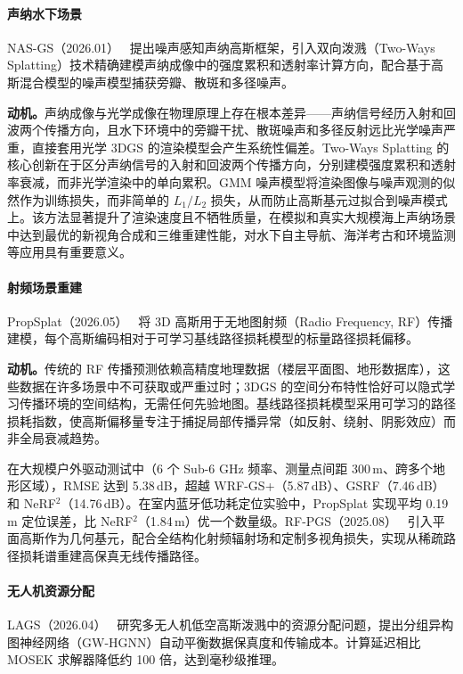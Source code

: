 \paragraph{声纳水下场景}

NAS-GS（2026.01）~\cite{2601_06285} 提出噪声感知声纳高斯框架，引入双向泼溅（Two-Ways Splatting）技术精确建模声纳成像中的强度累积和透射率计算方向，配合基于高斯混合模型的噪声模型捕获旁瓣、散斑和多径噪声。

\textbf{动机。}声纳成像与光学成像在物理原理上存在根本差异——声纳信号经历入射和回波两个传播方向，且水下环境中的旁瓣干扰、散斑噪声和多径反射远比光学噪声严重，直接套用光学 3DGS 的渲染模型会产生系统性偏差。Two-Ways Splatting 的核心创新在于区分声纳信号的入射和回波两个传播方向，分别建模强度累积和透射率衰减，而非光学渲染中的单向累积。GMM 噪声模型将渲染图像与噪声观测的似然作为训练损失，而非简单的 $L_1/L_2$ 损失，从而防止高斯基元过拟合到噪声模式上。该方法显著提升了渲染速度且不牺牲质量，在模拟和真实大规模海上声纳场景中达到最优的新视角合成和三维重建性能，对水下自主导航、海洋考古和环境监测等应用具有重要意义。

\paragraph{射频场景重建}

PropSplat（2026.05）~\cite{2605_08035} 将 3D 高斯用于无地图射频（Radio Frequency, RF）传播建模，每个高斯编码相对于可学习基线路径损耗模型的标量路径损耗偏移。

\textbf{动机。}传统的 RF 传播预测依赖高精度地理数据（楼层平面图、地形数据库），这些数据在许多场景中不可获取或严重过时；3DGS 的空间分布特性恰好可以隐式学习传播环境的空间结构，无需任何先验地图。基线路径损耗模型采用可学习的路径损耗指数，使高斯偏移量专注于捕捉局部传播异常（如反射、绕射、阴影效应）而非全局衰减趋势。

在大规模户外驱动测试中（6 个 Sub-6 GHz 频率、测量点间距 300\,m、跨多个地形区域），RMSE 达到 5.38\,dB，超越 WRF-GS+（5.87\,dB）、GSRF（7.46\,dB）和 NeRF$^2$（14.76\,dB）。在室内蓝牙低功耗定位实验中，PropSplat 实现平均 0.19\,m 定位误差，比 NeRF$^2$（1.84\,m）优一个数量级。RF-PGS（2025.08）~\cite{2508_16849} 引入平面高斯作为几何基元，配合全结构化射频辐射场和定制多视角损失，实现从稀疏路径损耗谱重建高保真无线传播路径。

\paragraph{无人机资源分配}

LAGS（2026.04）~\cite{2604_16910} 研究多无人机低空高斯泼溅中的资源分配问题，提出分组异构图神经网络（GW-HGNN）自动平衡数据保真度和传输成本。计算延迟相比 MOSEK 求解器降低约 100 倍，达到毫秒级推理。

